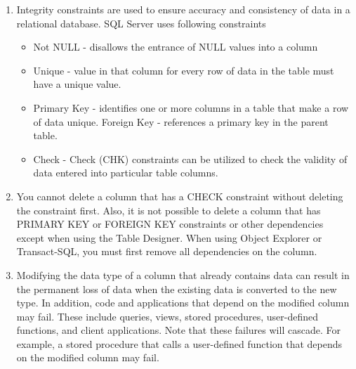 \documentclass[12pt]{article}
\begin{document}
\begin{enumerate}
\begin{itemize}
                \end{itemize}
                \item Integrity constraints are used to ensure accuracy and consistency of data in a relational database. SQL Server uses following constraints
                \begin{itemize}                       
                        \item Not NULL - disallows the entrance of NULL values into a column
                        \item Unique - value in that column for every row of data in the table must have a unique value.
                        \item Primary Key - identifies one or more columns in a table that make a row of data unique.
                        Foreign Key - references a primary key in the parent table.
                        \item Check - Check (CHK) constraints can be utilized to check the validity of data entered into particular table columns.
                \end{itemize}
                \item You cannot delete a column that has a CHECK constraint without deleting the constraint first. Also, it is not possible to delete a column that has PRIMARY KEY or FOREIGN KEY constraints or other dependencies except when using the Table Designer. When using Object Explorer or Transact-SQL, you must first remove all dependencies on the column.
                \item Modifying the data type of a column that already contains data can result in the permanent loss of data when the existing data is converted to the new type. In addition, code and applications that depend on the modified column may fail. These include queries, views, stored procedures, user-defined functions, and client applications. Note that these failures will cascade. For example, a stored procedure that calls a user-defined function that depends on the modified column may fail.
        \end{enumerate}
\end{document}
